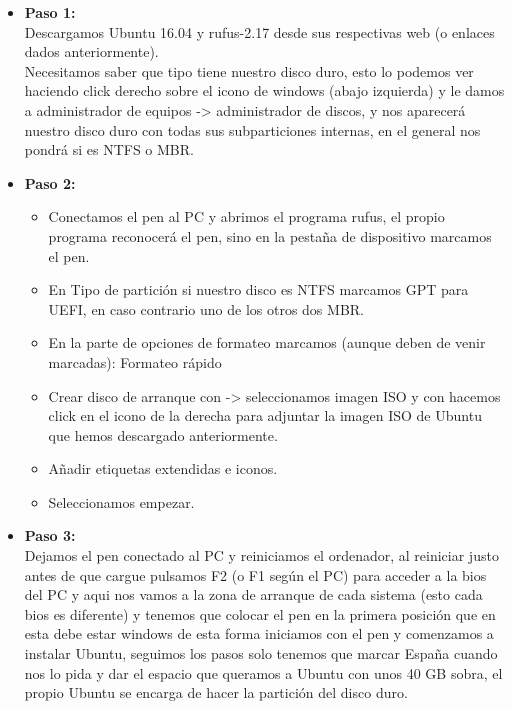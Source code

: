 \begin{itemize}
\item \textbf{Paso 1:}\\
Descargamos Ubuntu 16.04 y rufus-2.17 desde sus respectivas web (o enlaces dados anteriormente).\\
Necesitamos saber que tipo tiene nuestro disco duro, esto lo podemos ver haciendo click derecho sobre el icono de windows (abajo izquierda) y le damos a administrador de equipos -> administrador de discos, y nos aparecerá nuestro disco duro con todas sus subparticiones internas, en el general nos pondrá si es NTFS o MBR.\\

\item \textbf{Paso 2:}\\
\begin{itemize}
\item Conectamos el pen al PC y abrimos el programa rufus, el propio programa reconocerá el pen, sino en la pestaña de dispositivo marcamos el pen.

\item En Tipo de partición si nuestro disco es NTFS marcamos GPT para UEFI, en caso contrario uno de los otros dos MBR.

\item En la parte de opciones de formateo marcamos (aunque deben de venir marcadas): Formateo rápido

\item Crear disco de arranque con -> seleccionamos imagen ISO y con hacemos click en el icono de la derecha para adjuntar la imagen ISO de Ubuntu que hemos descargado anteriormente.

\item Añadir etiquetas extendidas e iconos.

\item Seleccionamos empezar.
\end{itemize}

\item \textbf{Paso 3:}\\
Dejamos el pen conectado al PC y reiniciamos el ordenador, al reiniciar justo antes de que cargue pulsamos F2 (o F1 según el PC) para acceder a la bios del PC y aqui nos vamos a la zona de arranque de cada sistema (esto cada bios es diferente) y tenemos que colocar el pen en la primera posición que en esta debe estar windows de esta forma iniciamos con el pen y comenzamos a instalar Ubuntu, seguimos los pasos solo tenemos que marcar España cuando nos lo pida y dar el espacio que queramos a Ubuntu con unos 40 GB sobra, el propio Ubuntu se encarga de hacer la partición del disco duro.\\


\end{itemize}
